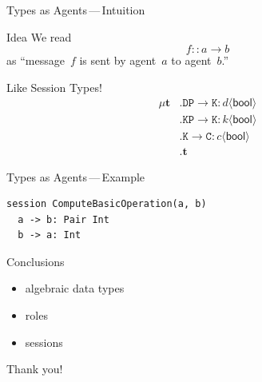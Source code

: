 \documentclass{beamer}
\begin{document}
\begin{frame}[fragile]{Types as Agents\,---\,Intuition}
\begin{block}{Idea}
We read \[f :: a \to b\] as
``message~$f$ is sent by agent~$a$ to agent~$b$.''
\end{block}
\begin{block}{Like Session Types!}
\begin{align*}
\mu\mathbf{t}&.\mathtt{DP}\to\mathtt{K}:d\langle\mathsf{bool}\rangle \\
  &.\mathtt{KP}\to\mathtt{K}:k\langle\mathsf{bool}\rangle\\
  &.\mathtt{K}\to\mathtt{C}:c\langle\mathsf{bool}\rangle\\
  &.\mathbf{t}
\end{align*}
\end{block}
\end{frame}

\begin{frame}[fragile]{Types as Agents\,---\,Example}
\begin{lstlisting}
session ComputeBasicOperation(a, b)
  a -> b: Pair Int
  b -> a: Int
\end{lstlisting}
\end{frame}

\begin{frame}{Conclusions}
\begin{itemize}
\item \alert{algebraic data types}
\item roles
\item sessions
\end{itemize}
\end{frame}

\begin{frame}
\centerline{Thank you!}
\end{frame}
\end{document}
